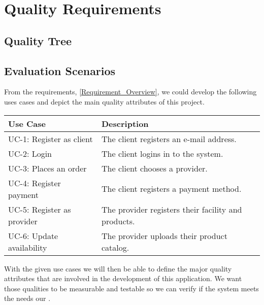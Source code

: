\section{Quality Requirements}

\subsection{Quality Tree}

\subsection{Evaluation Scenarios} 
From the requirements, \ref{Requirement_Overview}, we could develop the following uses cases and depict the main quality 
attributes of this project. 

\begin{table}[H]
    \begin{tabularx}{\textwidth}{lX}
    \toprule
    Use Case & Description  \\
    \midrule
    UC-1: Register as \gls{client} & The \gls{client} registers an e-mail address.\\
    UC-2: Login & The \gls{client} logins in to the system. \\
    UC-3: Places an order & The \gls{client} chooses a \gls{provider}. \\
    UC-4: Register payment & The \gls{client} registers a payment method. \\
    UC-5: Register as \gls{provider} & The \gls{provider} registers their facility and products. \\
    UC-6: Update availability & The \gls{provider} uploads their product catalog. \\
    \bottomrule
    \end{tabularx}
\end{table}


With the given use cases we will then be able to define the major quality attributes that are involved in the 
development of this application. We want those qualities to be measurable and testable so we can verify if the 
system meets the needs our  \cite{refbook:DSHC}.

